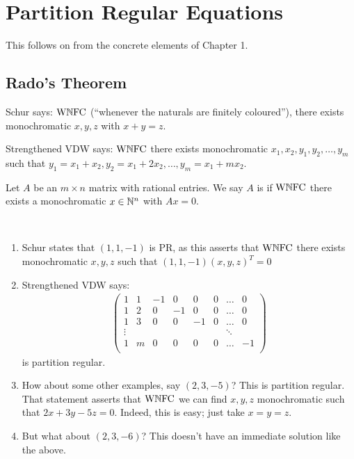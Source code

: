 \documentclass[10pt]{article}
\newcommand{\wnfc}{\textrm{W}\N\textrm{FC}}
\begin{document}

\section{Partition Regular Equations}

This follows on from the concrete elements of Chapter 1.

\subsection*{Rado's Theorem}

Schur says: $\wnfc$ (``whenever the naturals are finitely coloured''), there exists monochromatic $x,y,z$ with $x + y = z$.

Strengthened VDW says: $\wnfc$ there exists monochromatic $x_1,x_2,y_1,y_2,\dots,y_m$ such that $y_1 = x_1 + x_2, y_2 = x_1 + 2x_2,\dots,y_m = x_1 + mx_2$.

Let $A$ be an $m\times n$ matrix with rational entries. We say $A$ is  if $\wnfc$ there exists a monochromatic $x \in \mathbb{N}^n$ with $Ax = 0$.

\begin{remark*}[Examples]\ 
    \begin{enumerate}
        \item Schur states that $(1,1,-1)$ is PR, as this asserts that $\wnfc$ there exists monochromatic $x,y,z$ such that $(1,1,-1) (x,y,z)^T = 0$
        \item Strengthened VDW says:
        \begin{align*}
            \left(\begin{array}{cccccccc}
                1 & 1 & -1 & 0 & 0 & 0 & \dots & 0\\
                1 & 2 & 0 & -1 & 0 & 0 & \dots & 0\\
                1 & 3 & 0 & 0 & -1 & 0 & \dots & 0\\
                \vdots & & & & & & \ddots & \\
                1 & m & 0 & 0 & 0 & 0 &\dots & -1\\
            \end{array}\right)
        \end{align*}
        is partition regular.

        \item How about some other examples, say $(2,3,-5)$? This is partition regular. That statement asserts that $\wnfc$ we can find $x,y,z$ monochromatic such that $2x + 3y - 5z = 0$. Indeed, this is easy; just take $x = y = z$.
        
        \item But what about $(2,3,-6)$? This doesn't have an immediate solution like the above.
    \end{enumerate}
\end{remark*}
\end{document}
